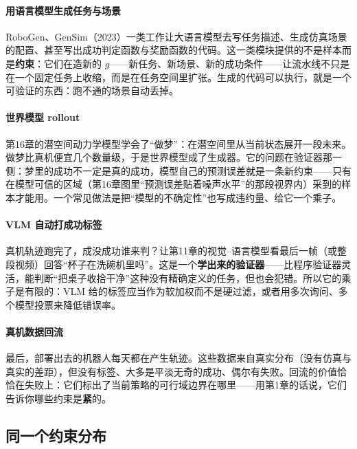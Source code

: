 \paragraph{用语言模型生成任务与场景} RoboGen、GenSim（2023）一类工作让大语言模型去写任务描述、生成仿真场景的配置、甚至写出成功判定函数与奖励函数的代码。这一类模块提供的不是样本而是\textbf{约束}：它们在造新的 $g$——新任务、新场景、新的成功条件——让流水线不只是在一个固定任务上收缩，而是在任务空间里扩张。生成的代码可以执行，就是一个可验证的东西：跑不通的场景自动丢掉。

\paragraph{世界模型 rollout} 第16章的潜空间动力学模型学会了“做梦”：在潜空间里从当前状态展开一段未来。做梦比真机便宜几个数量级，于是世界模型成了生成器。它的问题在验证器那一侧：梦里的成功不一定是真的成功，模型自己的预测误差就是一条新约束——只有在模型可信的区域（第16章图里“预测误差贴着噪声水平”的那段视界内）采到的样本才能用。一个常见做法是把“模型的不确定性”也写成违约量、给它一个乘子。

\paragraph{VLM 自动打成功标签} 真机轨迹跑完了，成没成功谁来判？让第11章的视觉--语言模型看最后一帧（或整段视频）回答“杯子在洗碗机里吗”。这是一个\textbf{学出来的验证器}——比程序验证器灵活，能判断“把桌子收拾干净”这种没有精确定义的任务，但也会犯错。所以它的乘子是有限的：VLM 给的标签应当作为软加权而不是硬过滤，或者用多次询问、多个模型投票来降低错误率。

\paragraph{真机数据回流} 最后，部署出去的机器人每天都在产生轨迹。这些数据来自真实分布（没有仿真与真实的差距），但没有标签、大多是平淡无奇的成功、偶尔有失败。回流的价值恰恰在失败上：它们标出了当前策略的可行域边界在哪里——用第1章的话说，它们告诉你哪些约束是\textbf{紧}的。

\subsection{同一个约束分布}

